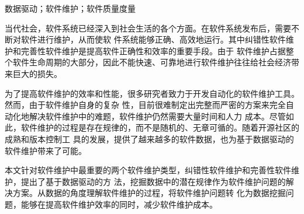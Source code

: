 \begin{guanjianci}
	数据驱动；软件维护；软件质量度量
\end{guanjianci}

当代社会，软件系统已经深入到社会生活的各个方面。在软件系统发布后，需要不断对软件进行维护，从而使软
件系统能够正确、高效地运行。其中纠错性软件维护和完善性软件维护是提高软件正确性和效率的重要手段。由于
软件维护占据整个软件生命周期的大部分，因此不能快速、可靠地进行软件维护往往给社会经济带来巨大的损失。

为了提高软件维护的效率和性能，很多研究者致力于开发自动化的软件维护工具。然而，由于软件维护自身的复杂
性，目前很难制定出完整而严密的方案来完全自动化地解决软件维护中的难题，软件维护仍然需要大量时间和人力
成本。尽管如此，软件维护的过程是存在规律的，而不是随机的、无章可循的。随着开源社区的成熟和版本控制工
具的发展，提供了越来越多的软件数据，也为基于数据驱动的软件维护带来了可能。

本文针对软件维护中最重要的两个软件维护类型，纠错性软件维护和完善性软件维护，提出了基于数据驱动的方
法，挖掘数据中的潜在规律作为软件维护问题的解决方案。从数据的角度理解软件维护的过程，将软件维护问题转
化为数据挖掘问题，能够在提高软件维护效率的同时，减少软件维护成本。

